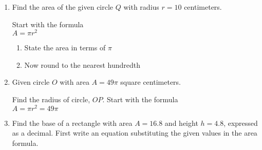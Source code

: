\documentclass[12pt, twoside]{article}
\begin{document}
\begin{enumerate}
\newpage
\item Find the area of the given circle $Q$ with radius $r=10$ centimeters.
  \begin{multicols}{2}
  \raggedcolumns
  Start with the formula\\[0.5cm]
  $A = \pi r^2$ 
  \begin{enumerate}
    \item State the area in terms of $\pi$ \vspace{1.7cm}
    \item Now round to the nearest hundredth
  \end{enumerate}

  \end{multicols}

\newpage
\item Given circle $O$ with area $A=49 \pi$ square centimeters.
  \begin{multicols}{2}
  \raggedcolumns
  Find the radius of circle, $OP$. Start with the formula\\[0.5cm]
  $A = \pi r^2 = 49 \pi$ \vspace{1.7cm}

  \end{multicols}

\newpage
\item Find the base of a rectangle with area $A=16.8$ and height $h=4.8$, expressed as a decimal. First write an equation substituting the given values in the area formula.
  \begin{flushright}
  \end{flushright}


\end{enumerate}
\end{document}
